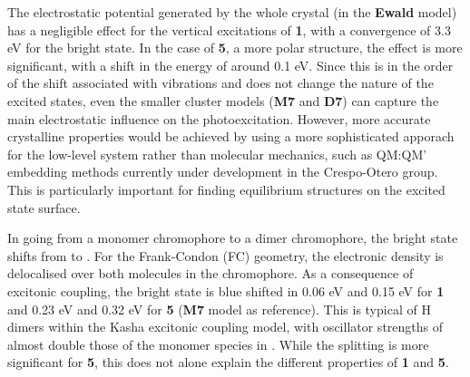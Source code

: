 The electrostatic potential generated by the whole crystal (in the \textbf{Ewald} model) has a negligible effect for the vertical excitations of \textbf{1}, with a convergence of 3.3 eV for the bright state. In the case of \textbf{5}, a more polar structure, the effect is more significant, with a shift in the energy of around 0.1 eV. Since this is in the order of the shift associated with vibrations and does not change the nature of the excited states, even the smaller cluster models (\textbf{M7} and \textbf{D7}) can capture the main electrostatic influence on the photoexcitation.\cite{Crespo-Otero2012} However, more accurate crystalline properties would be achieved by using a more sophisticated apporach for the low-level system rather than molecular mechanics, such as QM:QM' embedding methods currently under development in the Crespo-Otero group. This is particularly important for finding equilibrium structures on the excited state surface.

In going from a monomer chromophore to a dimer chromophore, the bright state shifts from \sone{} to \stwo.  For the Frank-Condon (FC) geometry, the electronic density is delocalised over both molecules in the chromophore. As a consequence of  excitonic coupling, the bright state is blue shifted in 0.06 eV and 0.15 eV  for \textbf{1} and 0.23 eV and 0.32 eV for \textbf{5} (\textbf{M7} model as reference). This is typical of H dimers within the Kasha excitonic coupling model, with oscillator strengths of \stwo{} almost double those of the monomer species in \sone.\cite{Kasha1965a} While the splitting is more significant for \textbf{5}, this does not alone explain the different properties of \textbf{1} and \textbf{5}. 

